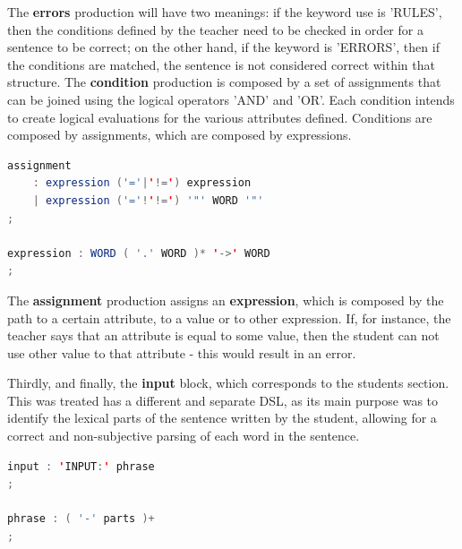The \textbf{errors} production will have two meanings: if the keyword use is 'RULES', then the conditions defined by the teacher need to be checked in order for a sentence to be correct; on the other hand, if the keyword is 'ERRORS', then if the conditions are matched, the sentence is not considered correct within that structure.
The \textbf{condition} production is composed by a set of assignments that can be joined using the logical operators 'AND' and 'OR'. 
Each condition intends to create logical evaluations for the various attributes defined.
Conditions are composed by assignments, which are composed by expressions.

\begin{center}
\begin{minipage}{10cm}
\begin{lstlisting}[language=java, basicstyle=\small, label={lst:dsl_cond_prod}, caption=DSL condition production]
assignment 
    : expression ('='|'!=') expression
    | expression ('='!'!=') '"' WORD '"'
;

expression : WORD ( '.' WORD )* '->' WORD 
;
\end{lstlisting}
\end{minipage}
\end{center}

The \textbf{assignment} production assigns an \textbf{expression}, which is composed by the path to a certain attribute, to a value or to other expression. 
If, for instance, the teacher says that an attribute is equal to some value, then the student can not use other value to that attribute - this would result in an error.

Thirdly, and finally, the \textbf{input} block, which corresponds to the students section. This was treated has a different and separate \textsc{DSL}, as its main purpose was to identify the lexical parts of the sentence written 
by the student, allowing for a correct and non-subjective parsing of each word in the sentence.

\begin{center}
\begin{minipage}{8cm}
\begin{lstlisting}[language=java, basicstyle=\small, label={lst:dsl_input_prod}, caption=DSL input production]
input : 'INPUT:' phrase 
;

phrase : ( '-' parts )+
;
\end{lstlisting}
\end{minipage}
\end{center}

